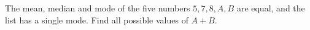 The mean, median and mode of the five numbers $5,7,8,A,B$ are equal, and the list has a single mode. Find all possible values of $A+B$.
